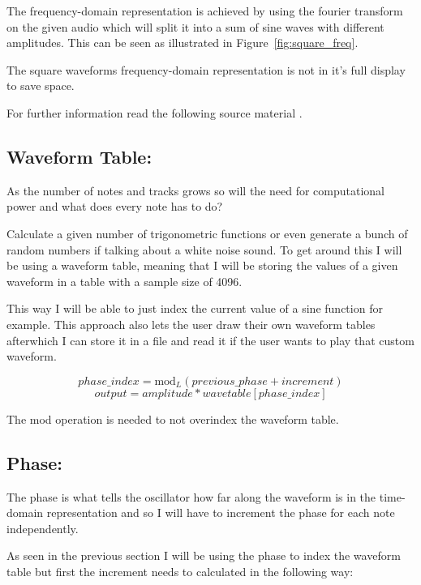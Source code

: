 \documentclass{article}
\begin{document}
The frequency-domain representation is achieved by using the 
fourier transform on the given audio which will split it into 
a sum of sine waves with different amplitudes. This can be seen as
illustrated in Figure~\ref{fig:square_freq}.

\begin{cnote}
    The square waveforms frequency-domain representation is not 
    in it's full display to save space.
\end{cnote}

\begin{cinfo}
    For further information read the following source material \cite[pp.~14--18]{curtis}.
\end{cinfo}

\subsection{Waveform Table:}
As the number of notes and tracks grows so will the need 
for computational power and what does every note has to do?

Calculate a given number of trigonometric functions or even generate 
a bunch of random numbers if talking about a white noise sound.
To get around this I will be using a waveform table, meaning that
I will be storing the values of a given waveform in a table with a 
sample size of 4096.

This way I will be able to just index the current value of a sine 
function for example. This approach also lets the user draw their own
waveform tables afterwhich I can store it in a file and read it 
if the user wants to play that custom waveform.

$$ 
phase\_index = \text{mod}_L(previous\_phase + increment)
$$ 
$$
output = amplitude * wavetable[phase\_index]
$$

\begin{cnote}
    The mod operation is needed to not overindex the waveform table.
\end{cnote}

\subsection{Phase:}
The phase is what tells the oscillator how far along the waveform 
is in the time-domain representation and so I will have to increment
the phase for each note independently.

As seen in the previous section I will be using the phase to 
index the waveform table but first the increment needs to calculated
in the following way:
\end{document}
